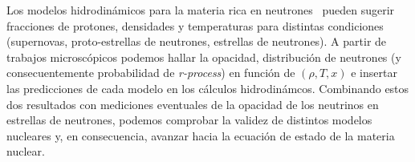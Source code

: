 Los modelos hidrodinámicos para la materia rica en neutrones~\cite{ruffert_coalescing_1995, mezzacappa_investigation_1998, geppert_temperature_2004, woosley_physics_2005, liebendorfer_supernova_2005} pueden sugerir fracciones de protones, densidades y temperaturas para distintas condiciones (supernovas, proto-estrellas de neutrones, estrellas de neutrones).
A partir de trabajos microscópicos podemos hallar la opacidad, distribución de neutrones (y consecuentemente probabilidad de \emph{r-process}) en función de $(\rho, T, x)$ e insertar las predicciones de cada modelo en los cálculos hidrodinámcos.
Combinando estos dos resultados con mediciones eventuales de la opacidad de los neutrinos en estrellas de neutrones, podemos comprobar la validez de distintos modelos nucleares y, en consecuencia, avanzar hacia la ecuación de estado de la materia nuclear.